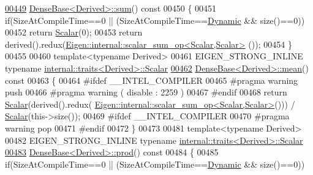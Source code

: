 \begin{DoxyCode}
\hyperlink{group___core___module_a4dee689c76ff86da9d8e49950604597b}{00449} \hyperlink{group___core___module_a4dee689c76ff86da9d8e49950604597b}{DenseBase<Derived>::sum}()\textcolor{keyword}{ const}
00450 \textcolor{keyword}{}\{
00451   \textcolor{keywordflow}{if}(SizeAtCompileTime==0 || (SizeAtCompileTime==\hyperlink{namespace_eigen_ad81fa7195215a0ce30017dfac309f0b2}{Dynamic} && size()==0))
00452     \textcolor{keywordflow}{return} \hyperlink{group___core___module_a5feed465b3a8e60c47e73ecce83e39a2}{Scalar}(0);
00453   \textcolor{keywordflow}{return} derived().redux(\hyperlink{struct_eigen_1_1internal_1_1scalar__sum__op}{Eigen::internal::scalar\_sum\_op<Scalar,Scalar>}
      ());
00454 \}
00455 
00460 \textcolor{keyword}{template}<\textcolor{keyword}{typename} Derived>
00461 EIGEN\_STRONG\_INLINE \textcolor{keyword}{typename} \hyperlink{struct_eigen_1_1internal_1_1traits}{internal::traits<Derived>::Scalar}
\hyperlink{group___core___module_a89d85ac0cf349eb53481c148033459d7}{00462} \hyperlink{group___core___module_a89d85ac0cf349eb53481c148033459d7}{DenseBase<Derived>::mean}()\textcolor{keyword}{ const}
00463 \textcolor{keyword}{}\{
00464 \textcolor{preprocessor}{#ifdef \_\_INTEL\_COMPILER}
00465 \textcolor{preprocessor}{  #pragma warning push}
00466 \textcolor{preprocessor}{  #pragma warning ( disable : 2259 )}
00467 \textcolor{preprocessor}{#endif}
00468   \textcolor{keywordflow}{return} \hyperlink{group___core___module_a5feed465b3a8e60c47e73ecce83e39a2}{Scalar}(derived().redux(
      \hyperlink{struct_eigen_1_1internal_1_1scalar__sum__op}{Eigen::internal::scalar\_sum\_op<Scalar,Scalar>}())) / 
      \hyperlink{group___core___module_a5feed465b3a8e60c47e73ecce83e39a2}{Scalar}(this->size());
00469 \textcolor{preprocessor}{#ifdef \_\_INTEL\_COMPILER}
00470 \textcolor{preprocessor}{  #pragma warning pop}
00471 \textcolor{preprocessor}{#endif}
00472 \}
00473 
00481 \textcolor{keyword}{template}<\textcolor{keyword}{typename} Derived>
00482 EIGEN\_STRONG\_INLINE \textcolor{keyword}{typename} \hyperlink{struct_eigen_1_1internal_1_1traits}{internal::traits<Derived>::Scalar}
\hyperlink{group___core___module_a175ceb201923b4c6767770559e47e40e}{00483} \hyperlink{group___core___module_a175ceb201923b4c6767770559e47e40e}{DenseBase<Derived>::prod}()\textcolor{keyword}{ const}
00484 \textcolor{keyword}{}\{
00485   \textcolor{keywordflow}{if}(SizeAtCompileTime==0 || (SizeAtCompileTime==\hyperlink{namespace_eigen_ad81fa7195215a0ce30017dfac309f0b2}{Dynamic} && size()==0))

\end{DoxyCode}
